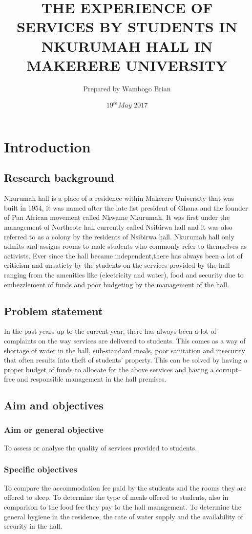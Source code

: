 \documentclass[12pt, a4paper]{article}
\title{THE EXPERIENCE OF SERVICES BY STUDENTS IN NKURUMAH HALL IN MAKERERE UNIVERSITY}
\author{Prepared by Wambogo Brian}
\date{$19^{th} May$ $2017$}
\begin{document}
\maketitle
\clearpage
\section{Introduction}
\subsection{Research background}
Nkurumah hall is a place of a residence within Makerere University that was built in 1954, it was named after the late fist president of Ghana and the founder of Pan African movement called Nkwame Nkurumah. It was first under the management of Northcote hall currently called Nsibirwa hall and it was also referred to as a colony by the residents of Nsibirwa hall. Nkurumah hall only admits and assigns rooms to male students who commonly refer to themselves as activists. Ever since the hall became independent,there has always been a lot of criticism and unsatiety by the students on the services provided by the hall ranging from the amenities like (electricity and water), food and security due to embezzlement of funds and poor budgeting by the management of the hall.
\subsection{Problem statement}
In the past years up to the current year, there has always been a lot of complaints on the way services are delivered to students. This comes as a way of shortage of water in the hall, sub-standard meals, poor sanitation and insecurity that often results into theft of students’ property. This can be solved by having a proper budget of funds to allocate for the above services and having a corrupt–free and responsible management in the hall premises.
\subsection{Aim and objectives}
\subsubsection{Aim or general objective}
To assess or analyse the quality of services provided to students.
\subsubsection{Specific objectives}
To compare  the accommodation fee paid by the students and the rooms they are offered to sleep.
To determine the type of meals offered to students, also in comparison to the food fee they pay to the hall management.
To determine the general hygiene in the residence, the rate of water supply and the availability of security in the hall.
\end{document}
